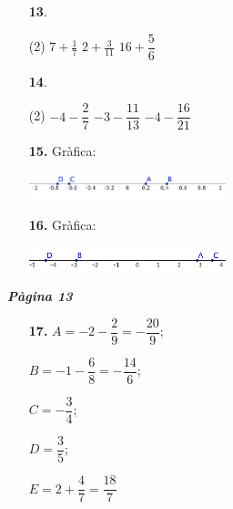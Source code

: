 \documentclass[a4paper, pdf, twoside]{book}
\begin{document}
\begin{multicols}{2}
\begin{enumerate}

 \item[\fontfamily{phv}\selectfont\color{blue}\textbf{13}. ] 
 \begin{tasks}[column-sep=1em, item-indent=1.3333em](2)
	 \task $7+\frac {1}{7}$
	 \task $2+\frac {3}{11}$
	 \task $16+\dfrac {5}{6}$
\end{tasks}
 \end{enumerate}
\begin{enumerate}
\vspace{0.25cm}



 \item[\fontfamily{phv}\selectfont\color{blue}\textbf{14}. ] 
 \begin{tasks}[column-sep=1em, item-indent=1.3333em](2)
	 \task $-4-\dfrac {2}{7}$
	 \task $-3-\dfrac {11}{13}$
	 \task $-4-\dfrac {16}{21}$
\end{tasks}
\vspace{0.25cm}
\item[\fontfamily{phv}\selectfont\color{blue}\textbf{15. }] 
Gràfica:\par \includegraphics [width=0.45\textwidth ]{img-sol/t1-recta1}
\vspace{0.25cm}
\item[\fontfamily{phv}\selectfont\color{blue}\textbf{16. }] 
Gràfica:\par \includegraphics [width=0.45\textwidth ]{img-sol/t1-recta2}
 \end{enumerate}
\vspace{0.3cm}


{\textbf{\em Pàgina 13}} \hrulefill
\begin{enumerate}
\vspace{0.25cm}
\item[\fontfamily{phv}\selectfont\color{blue}\textbf{17. }] 
$A=-2-\dfrac {2}{9}=-\dfrac {20}{9}$;\par $B=-1-\dfrac {6}{8}=-\dfrac {14}{6}$;\par $C=-\dfrac {3}{4}$;\par $D=\dfrac {3}{5}$;\par $E=2+\dfrac {4}{7}=\dfrac {18}{7}$
 \end{enumerate}
\begin{enumerate}
\vspace{0.25cm}



\end{enumerate}
\end{multicols}
\end{document}
